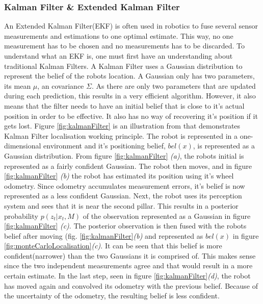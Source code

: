 \subsubsection{Kalman Filter \& Extended Kalman Filter}
An Extended Kalman Filter(EKF) is often used in robotics to fuse several sensor measurements and estimations to one optimal estimate. This way, no one measurement has to be chosen and no measurements has to be discarded. To understand what an EKF is, one must first have an understanding about traditional Kalman Filters. A Kalman Filter uses a Gaussian distribution to represent the belief of the robots location. A Gaussian only has two parameters, its mean $\mu$, an covariance $\Sigma$. As there are only two parameters that are updated during each prediction, this results in a very efficient algorithm. However, it also means that the filter needs to have an initial belief that is close to it's actual position in order to be effective. It also has no way of recovering it's position if it gets lost. Figure \ref{fig:kalmanFilter} is an illustration from \cite{SiegwartRoland2011Itam} that demonstrates Kalman Filter localisation working principle. The robot is represented in a one-dimensional environment and it's positioning belief, $bel(x)$, is represented as a Gaussian distribution. From figure \ref{fig:kalmanFilter} \textit{(a)}, the robots initial is represented as a fairly confident Gaussian. The robot then moves, and in figure \ref{fig:kalmanFilter} \textit{(b)} the robot has estimated its position using it's wheel odometry. Since odometry accumulates measurement errors, it's belief is now represented as a less confident Gaussian. Next, the robot uses its perception system and sees that it is near the second pillar. This results in a posterior probability $p(z_t | x_t,M)$ of the observation represented as a Gaussian in figure \ref{fig:kalmanFilter} \textit{(c)}. The posterior observation is then fused with the robots belief after moving (fig. \ref{fig:kalmanFilter}\textit{(b)} and represented as $bel(x)$ in figure \ref{fig:monteCarloLocalisation}\textit{(c)}. It can be seen that this belief is more confident(narrower) than the two Gaussians it is comprised of. This makes sense since the two independent measurements agree and that would result in a more certain estimate. In the last step, seen in figure \ref{fig:kalmanFilter}\textit{(d)}, the robot has moved again and convolved its odometry with the previous belief. Because of the uncertainty of the odometry, the resulting belief is less confident.

